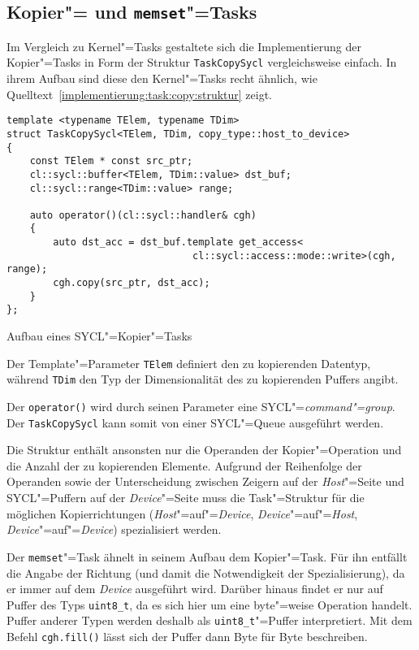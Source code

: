 \subsection{Kopier"= und \texttt{memset}"=Tasks}

Im Vergleich zu Kernel"=Tasks gestaltete sich die Implementierung der
Kopier"=Tasks in Form der Struktur \texttt{TaskCopySycl} vergleichsweise
einfach. In ihrem Aufbau sind diese den Kernel"=Tasks recht ähnlich, wie
Quelltext~\ref{implementierung:task:copy:struktur} zeigt.

\begin{code}
    \begin{verbatim}
template <typename TElem, typename TDim>
struct TaskCopySycl<TElem, TDim, copy_type::host_to_device>
{
    const TElem * const src_ptr;
    cl::sycl::buffer<TElem, TDim::value> dst_buf;
    cl::sycl::range<TDim::value> range;

    auto operator()(cl::sycl::handler& cgh)
    {
        auto dst_acc = dst_buf.template get_access<
                                cl::sycl::access::mode::write>(cgh, range);
        cgh.copy(src_ptr, dst_acc);
    }
};
    \end{verbatim}
    \caption{Aufbau eines SYCL"=Kopier"=Tasks}
    \label{implementierung:task:copy:struktur}
\end{code}

Der Template"=Parameter \texttt{TElem} definiert den zu kopierenden Datentyp,
während \texttt{TDim} den Typ der Dimensionalität des zu kopierenden Puffers
angibt.  

Der \texttt{operator()} wird durch seinen Parameter eine
SYCL"=\textit{command"=group}. Der \texttt{TaskCopySycl} kann somit von einer
SYCL"=Queue ausgeführt werden.

Die Struktur enthält ansonsten nur die Operanden der Kopier"=Operation und die
Anzahl der zu kopierenden Elemente. Aufgrund der Reihenfolge der Operanden sowie
der Unterscheidung zwischen Zeigern auf der \textit{Host}"=Seite und
SYCL"=Puffern auf der \textit{Device}"=Seite muss die Task"=Struktur für die
möglichen Kopierrichtungen (\textit{Host}"=auf"=\textit{Device},
\textit{Device}"=auf"=\textit{Host}, \textit{Device}"=auf"=\textit{Device})
spezialisiert werden.

Der \texttt{memset}"=Task ähnelt in seinem Aufbau dem Kopier"=Task. Für ihn
entfällt die Angabe der Richtung (und damit die Notwendigkeit der
Spezialisierung), da er immer auf dem \textit{Device} ausgeführt wird. Darüber
hinaus findet er nur auf Puffer des Typs \texttt{uint8\_t}, da es sich hier um
eine byte"=weise Operation handelt. Puffer anderer Typen werden deshalb
als \texttt{uint8\_t}"=Puffer interpretiert. Mit dem Befehl \texttt{cgh.fill()}
lässt sich der Puffer dann Byte für Byte beschreiben.

